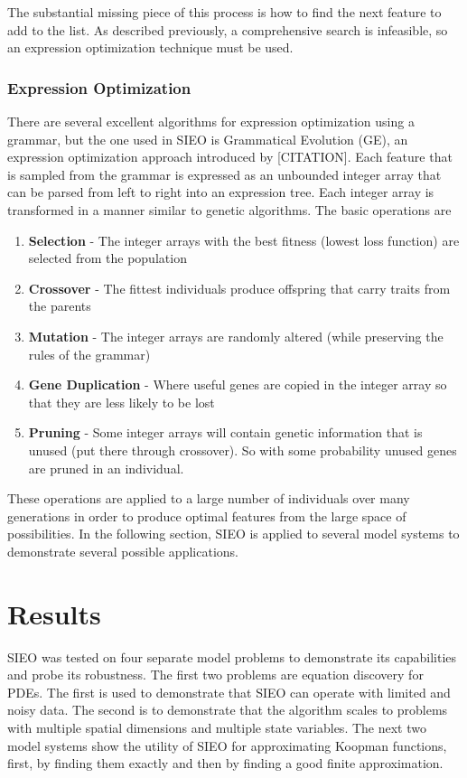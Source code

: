 \documentclass{article}
\begin{document}
The substantial missing piece of this process is how to find the next feature to add to the list. As described previously, a comprehensive search is infeasible, so an expression optimization technique must be used.


\subsubsection{Expression Optimization}
There are several excellent algorithms for expression optimization using a grammar, but the one used in SIEO is  Grammatical Evolution (GE), an expression optimization approach introduced by [CITATION]. Each feature that is sampled from the grammar is expressed as an unbounded integer array that can be parsed from left to right into an expression tree. Each integer array is transformed in a manner similar to genetic algorithms. The basic operations are
\begin{enumerate}
\item \textbf{Selection} - The integer arrays with the best fitness (lowest loss function) are selected from the population
\item \textbf{Crossover} - The fittest individuals produce offspring that carry traits from the parents
\item \textbf{Mutation} - The integer arrays are randomly altered (while preserving the rules of the grammar)
\item \textbf{Gene Duplication} - Where useful genes are copied in the integer array so that they are less likely to be lost
\item \textbf{Pruning} - Some integer arrays will contain genetic information that is unused (put there through crossover). So with some probability unused genes are pruned in an individual.
\end{enumerate}

These operations are applied to a large number of individuals over many generations in order to produce optimal features from the large space of possibilities. In the following section, SIEO is applied to several model systems to demonstrate several possible applications.


\section{Results}
\label{results}
SIEO was tested on four separate model problems to demonstrate its capabilities and probe its robustness. The first two problems are equation discovery for PDEs. The first is used to demonstrate that SIEO can operate with limited and noisy data. The second is to demonstrate that the algorithm scales to problems with multiple spatial dimensions and multiple state variables. The next two model systems show the utility of SIEO for approximating Koopman functions, first, by finding them exactly and then by finding a good finite approximation.
\end{document}
